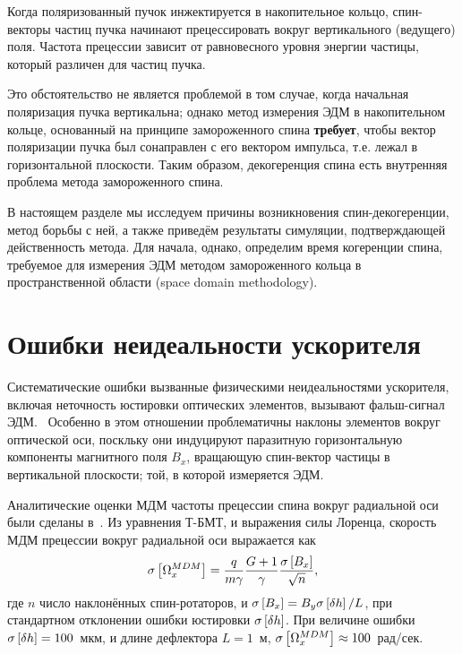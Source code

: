 Когда поляризованный пучок инжектируется в накопительное кольцо, спин-векторы 
частиц пучка начинают прецессировать вокруг вертикального
(ведущего) поля. Частота прецессии зависит от равновесного уровня
энергии частицы, который различен для частиц пучка.

Это обстоятельство не является проблемой в том случае, когда начальная
поляризация пучка вертикальна; однако метод измерения ЭДМ в
накопительном кольце, основанный
на принципе замороженного спина \textbf{требует}, чтобы вектор поляризации
пучка был сонаправлен с его вектором импульса, т.е. лежал в
горизонтальной плоскости. Таким образом, декогеренция спина есть
внутренняя проблема метода замороженного спина.

В настоящем разделе мы исследуем причины возникновения спин-декогеренции,
метод борьбы с ней, а также приведём результаты симуляции, подтверждающей действенность
метода. Для начала, однако, определим время когеренции спина, требуемое для 
измерения ЭДМ методом замороженного кольца в пространственной области (space domain methodology).



\section{Ошибки неидеальности ускорителя}\label{chpt3:imperfections}
Систематические ошибки вызванные физическими неидеальностями
ускорителя, включая неточность юстировки оптических элементов,
вызывают фальш-сигнал ЭДМ.~\cite[стр.~230]{Eremey:Thesis} Особенно в
этом отношении проблематичны наклоны элементов вокруг оптической оси, поскльку они
индуцируют паразитную горизонтальную компоненты магнитного поля $B_x$, 
вращающую спин-вектор частицы в вертикальной плоскости; той, в которой измеряется ЭДМ.

Аналитические оценки МДМ частоты прецессии спина вокруг радиальной оси 
были сделаны в~\cite{Senichev:FDM}. 
Из уравнения Т-БМТ, и выражения силы Лоренца,
скорость МДМ прецессии вокруг радиальной оси выражается как
\begin{equation}\label{eq:tilted-MDM-precession-freq}
\SD{\W_x^{MDM}} = \frac{q}{m\gamma}\frac{G+1}{\gamma}\frac{\SD{B_x}}{\sqrt{n}},
\end{equation}
где $n$ число наклонённых спин-ротаторов, и ${\SD{B_x} = B_y\SD{\delta h}/L}$, 
при стандартном отклонении ошибки юстировки
$\SD{\delta h}$. При величине ошибки ${\SD{\delta h} = 100}$~мкм, и
длине дефлектора $L=1$~м, ${\SD{\W_x^{MDM}} \approx 100}$~рад/сек.~\cite{Senichev:FDM}

